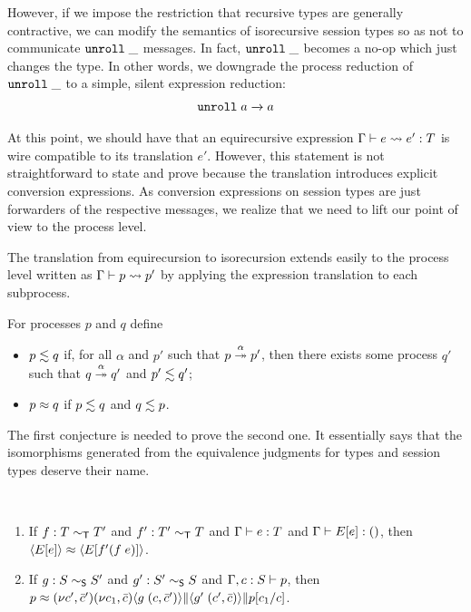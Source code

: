 However, if we impose the restriction that recursive types are
generally contractive, we can modify the semantics of isorecursive
session types so as not to communicate $\EUnroll\_$ messages. In fact,
$\EUnroll\_$ becomes a no-op which just changes the type. In other
words, we downgrade the process reduction of $\EUnroll\_$ to a simple,
silent expression reduction:
\begin{gather*}
  \reduce{\EUnroll a}{a}
\end{gather*}

At this point, we should have that an equirecursive expression
$\translation e{e'} T$ is wire compatible to its translation
$e'$. However, this statement is not straightforward to state and
prove because the translation introduces explicit conversion
expressions. As conversion expressions on session types are
just forwarders of the respective messages, we realize that we need to
lift our point of view to the process level.

The translation from equirecursion to isorecursion extends easily to
the process level written as $\Ptranslation p{p'}$ by applying the
expression translation to each subprocess.


\begin{definition}
  For processes $p$ and $q$ define
  \begin{itemize}
  \item $p \leftsim q$ if, for all $\alpha$ and $p'$ such that
    $\reducemany[\alpha] p{p'}$, then there exists some process $q'$
    such that $\reducemany[\alpha] q{q'}$ and $p' \leftsim q'$;
  \item $p \bisim q$ if $p \leftsim q$ and $q \leftsim p$.
  \end{itemize}
\end{definition}

The first conjecture is needed to prove the second one. It essentially
says that the isomorphisms generated from the equivalence judgments
for types and session types deserve their name.

\begin{conjecture}[Conversion]~
  \begin{enumerate}
  \item
    If $f : T \eqt T'$ and $f' : T' \eqt T$ and $\typing eT$ and
    $\typing {E[e]}\TUnit$, then 
    $\PExp{E[e]} \bisim \PExp{E[f' (f\;e)]}$.
  \item If $g : S \eqs S'$
    and $g' : S' \eqs S$
    and $\Ptyping[\Ctxt, c : S]p$, then\\
    $p \bisim
    \PScope[c', \bar c']\PScope[c_1, \bar c]
    \PPar{\PPar {\PExp{g \; (c, \bar c')}}{\PExp{g' \; (c', \bar c)}}}{p[c_1/c]}$.
  \end{enumerate}
\end{conjecture}


